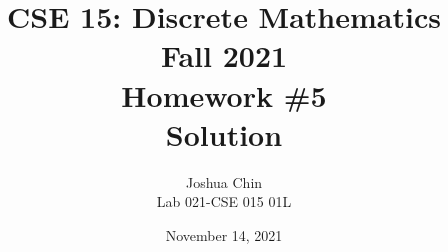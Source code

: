 \documentclass[11pt]{article}
\begin{document}
\author{Joshua Chin\\
Lab 021-CSE 015 01L}

\title{CSE 15: Discrete Mathematics\\
Fall 2021\\
Homework \#5\\
Solution}

\date{November 14, 2021}
\maketitle

\begin{enumerate}


\end{enumerate}
\end{document}
